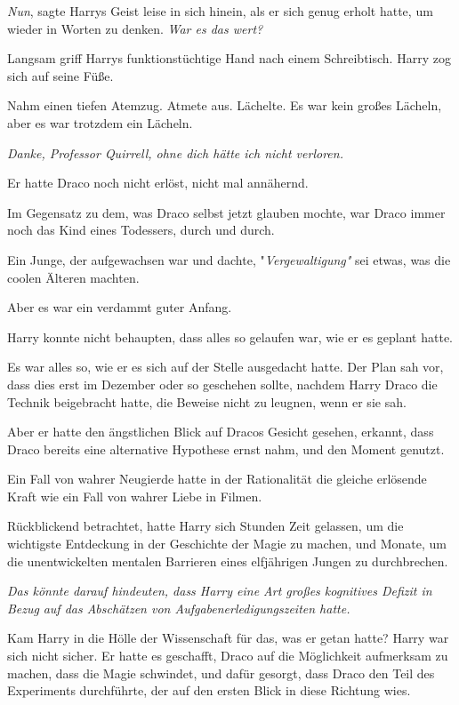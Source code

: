 {\emph{Nun}, sagte Harrys Geist leise in sich hinein, als er sich genug erholt hatte, um wieder in Worten zu denken. \emph{War es das wert?}

Langsam griff Harrys funktionstüchtige Hand nach einem Schreibtisch. Harry zog sich auf seine Füße.

Nahm einen tiefen Atemzug. Atmete aus. Lächelte. Es war kein großes Lächeln, aber es war trotzdem ein Lächeln.

\emph{Danke, Professor Quirrell, ohne dich hätte ich nicht verloren.}

Er hatte Draco noch nicht erlöst, nicht mal annähernd.

Im Gegensatz zu dem, was Draco selbst jetzt glauben mochte, war Draco immer noch das Kind eines Todessers, durch und durch.

Ein Junge, der aufgewachsen war und dachte, "\emph{Vergewaltigung"} sei etwas, was die coolen Älteren machten.

Aber es war ein verdammt guter Anfang.

Harry konnte nicht behaupten, dass alles so gelaufen war, wie er es geplant hatte.

Es war alles so, wie er es sich auf der Stelle ausgedacht hatte. Der Plan sah vor, dass dies erst im Dezember oder so geschehen sollte, nachdem Harry Draco die Technik beigebracht hatte, die Beweise nicht zu leugnen, wenn er sie sah.

Aber er hatte den ängstlichen Blick auf Dracos Gesicht gesehen, erkannt, dass Draco bereits eine alternative Hypothese ernst nahm, und den Moment genutzt.

Ein Fall von wahrer Neugierde hatte in der Rationalität die gleiche erlösende Kraft wie ein Fall von wahrer Liebe in Filmen.

Rückblickend betrachtet, hatte Harry sich Stunden Zeit gelassen, um die wichtigste Entdeckung in der Geschichte der Magie zu machen, und Monate, um die unentwickelten mentalen Barrieren eines elfjährigen Jungen zu durchbrechen.

\emph{Das könnte darauf hindeuten, dass Harry eine Art großes kognitives Defizit in Bezug} \emph{auf das Abschätzen von Aufgabenerledigungszeiten hatte.}

Kam Harry in die Hölle der Wissenschaft für das, was er getan hatte? Harry war sich nicht sicher. Er hatte es geschafft, Draco auf die Möglichkeit aufmerksam zu machen, dass die Magie schwindet, und dafür gesorgt, dass Draco den Teil des Experiments durchführte, der auf den ersten Blick in diese Richtung wies.

}
